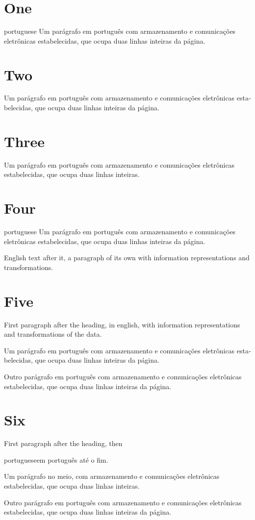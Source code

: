 \documentclass{article}
\begin{document}
\section{One}
\begin{otherlanguage*}{portuguese}
Um parágrafo em português com armazenamento e comunicações eletrônicas estabelecidas, que ocupa duas linhas inteiras da página.
\end{otherlanguage*}

\section{Two}
\begin{otherlanguage}{portuguese}
Um parágrafo em português com armazenamento e comunicações eletrônicas estabelecidas, que ocupa duas linhas inteiras da página.
\end{otherlanguage}

\section{Three}
\foreignlanguage{portuguese}{Um parágrafo} em português com armazenamento e comunicações eletrônicas estabelecidas, que ocupa duas linhas inteiras.

\section{Four}
\begin{otherlanguage*}{portuguese}
Um parágrafo em português com armazenamento e comunicações eletrônicas estabelecidas, que ocupa duas linhas inteiras da página.

\end{otherlanguage*}
English text after it, a paragraph of its own with information representations and transformations.
\section{Five}
First paragraph after the heading, in english, with information representations and transformations of the data.

\begin{otherlanguage}{portuguese}
Um parágrafo em português com armazenamento e comunicações eletrônicas estabelecidas, que ocupa duas linhas inteiras da página.

Outro parágrafo em português com armazenamento e comunicações eletrônicas estabelecidas, que ocupa duas linhas inteiras da página.
\end{otherlanguage}
\section{Six}
First paragraph after the heading, then \begin{otherlanguage*}{portuguese}em português até o fim.

Um parágrafo no meio, com armazenamento e comunicações eletrônicas estabelecidas, que ocupa duas linhas inteiras.

Outro parágrafo em português com armazenamento e comunicações eletrônicas estabelecidas, que ocupa duas linhas inteiras da página.
\end{otherlanguage*}
\end{document}
